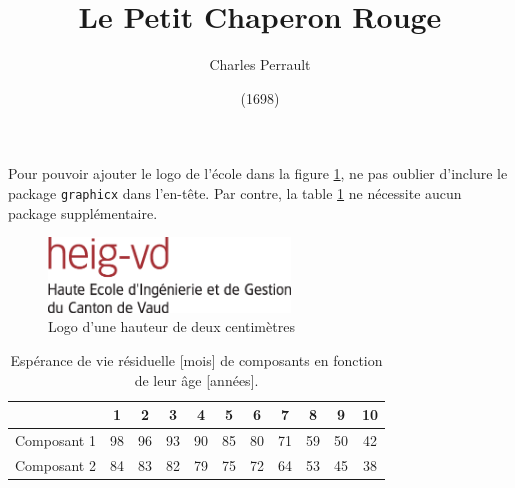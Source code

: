 \documentclass[a4paper,11pt]{article}
\title{Le Petit Chaperon Rouge}
\author{Charles Perrault}
\date{(1698)}
\begin{document}
\maketitle

\noindent Pour pouvoir ajouter le logo de l'école dans la figure \ref{figlogo}, ne pas oublier d'inclure le package \texttt{graphicx} dans l'en-tête. Par contre, la table \ref{TabEspVie} ne nécessite aucun package supplémentaire.

\begin{figure}[ht]
\begin{center}
\includegraphics[height=2cm]{logo-HEIG-VD.eps}
\caption{\label{figlogo}Logo d'une hauteur de deux centimètres}
\end{center}
\end{figure}

\begin{table}[ht]
\begin{center}
\begin{tabular}{l|*{10}{c}}
            &  1 &  2 &  3 &  4 &  5 &  6 &  7 &  8 &  9 & 10\\\hline
Composant 1 & 98 & 96 & 93 & 90 & 85 & 80 & 71 & 59 & 50 & 42\\
Composant 2 & 84 & 83 & 82 & 79 & 75 & 72 & 64 & 53 & 45 & 38
\end{tabular}
\caption{\label{TabEspVie}Espérance de vie résiduelle [mois] de composants en fonction de leur âge [années].}
\end{center}
\end{table}
\end{document}
